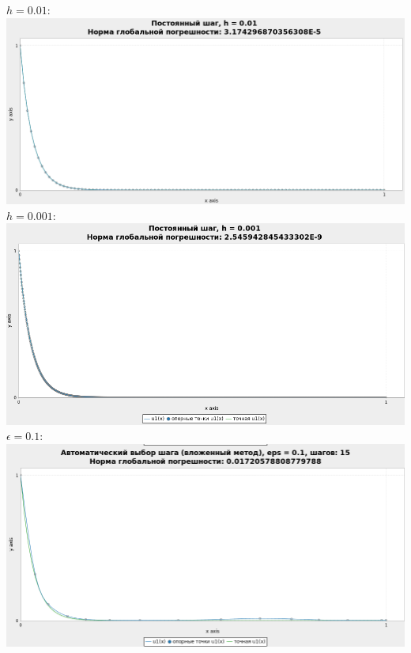 \documentclass[a4paper,12pt]{article}
\begin{document}
\begin{flushleft}
\begin{enumerate}
      $h = 0.01:$\linebreak\linebreak\includegraphics{exp_h_0_01.png}\linebreak\linebreak
      $h = 0.001:$\linebreak\linebreak\includegraphics{exp_h_0_001.png}\linebreak\linebreak
      $\epsilon = 0.1:$\linebreak\linebreak\includegraphics{exp_eps_0_1.png}\linebreak\linebreak

\end{enumerate}
\end{flushleft}
\end{document}

